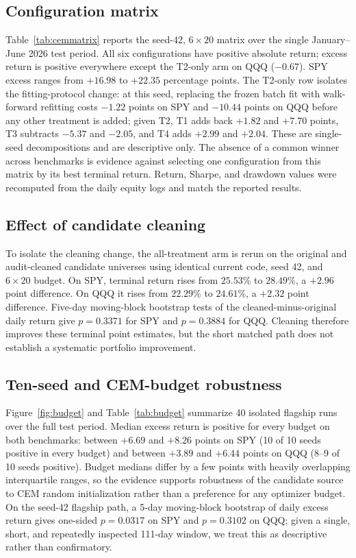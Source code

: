 \documentclass[sigconf,anonymous]{acmart}
\begin{document}
\subsection{Configuration matrix}

Table~\ref{tab:cemmatrix} reports the seed-42, $6\times20$ matrix over the single January--June 2026 test period. All six configurations have positive absolute return; excess return is positive everywhere except the T2-only arm on QQQ ($-0.67$). SPY excess ranges from $+16.98$ to $+22.35$ percentage points. The T2-only row isolates the fitting-protocol change: at this seed, replacing the frozen batch fit with walk-forward refitting costs $-1.22$ points on SPY and $-10.44$ points on QQQ before any other treatment is added; given T2, T1 adds back $+1.82$ and $+7.70$ points, T3 subtracts $-5.37$ and $-2.05$, and T4 adds $+2.99$ and $+2.04$. These are single-seed decompositions and are descriptive only. The absence of a common winner across benchmarks is evidence against selecting one configuration from this matrix by its best terminal return. Return, Sharpe, and drawdown values were recomputed from the daily equity logs and match the reported results.



\subsection{Effect of candidate cleaning}

To isolate the cleaning change, the all-treatment arm is rerun on the original and audit-cleaned candidate universes using identical current code, seed 42, and $6\times20$ budget. On SPY, terminal return rises from $25.53\%$ to $28.49\%$, a $+2.96$ point difference. On QQQ it rises from $22.29\%$ to $24.61\%$, a $+2.32$ point difference. Five-day moving-block bootstrap tests of the cleaned-minus-original daily return give $p=0.3371$ for SPY and $p=0.3884$ for QQQ. Cleaning therefore improves these terminal point estimates, but the short matched path does not establish a systematic portfolio improvement.

\subsection{Ten-seed and CEM-budget robustness}

Figure~\ref{fig:budget} and Table~\ref{tab:budget} summarize 40 isolated flagship runs over the full test period. Median excess return is positive for every budget on both benchmarks: between $+6.69$ and $+8.26$ points on SPY (10 of 10 seeds positive in every budget) and between $+3.89$ and $+6.44$ points on QQQ (8--9 of 10 seeds positive). Budget medians differ by a few points with heavily overlapping interquartile ranges, so the evidence supports robustness of the candidate source to CEM random initialization rather than a preference for any optimizer budget. On the seed-42 flagship path, a 5-day moving-block bootstrap of daily excess return gives one-sided $p=0.0317$ on SPY and $p=0.3102$ on QQQ; given a single, short, and repeatedly inspected 111-day window, we treat this as descriptive rather than confirmatory.
\end{document}
